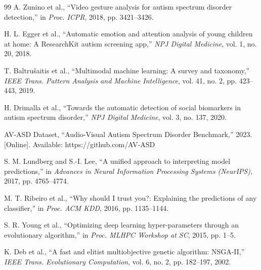 \documentclass[conference]{IEEEtran}
\begin{document}
\begin{thebibliography}{99}
A. Zunino et al., ``Video gesture analysis for autism spectrum disorder detection,'' in \textit{Proc. ICPR}, 2018, pp. 3421--3426.

H. L. Egger et al., ``Automatic emotion and attention analysis of young children at home: A ResearchKit autism screening app,'' \textit{NPJ Digital Medicine}, vol. 1, no. 20, 2018.

T. Baltru\v{s}aitis et al., ``Multimodal machine learning: A survey and taxonomy,'' \textit{IEEE Trans. Pattern Analysis and Machine Intelligence}, vol. 41, no. 2, pp. 423--443, 2019.

H. Drimalla et al., ``Towards the automatic detection of social biomarkers in autism spectrum disorder,'' \textit{NPJ Digital Medicine}, vol. 3, no. 137, 2020.

AV-ASD Dataset, ``Audio-Visual Autism Spectrum Disorder Benchmark,'' 2023. [Online]. Available: https://github.com/AV-ASD

S. M. Lundberg and S.-I. Lee, ``A unified approach to interpreting model predictions,'' in \textit{Advances in Neural Information Processing Systems (NeurIPS)}, 2017, pp. 4765--4774.

M. T. Ribeiro et al., ``Why should I trust you?: Explaining the predictions of any classifier,'' in \textit{Proc. ACM KDD}, 2016, pp. 1135--1144.

S. R. Young et al., ``Optimizing deep learning hyper-parameters through an evolutionary algorithm,'' in \textit{Proc. MLHPC Workshop at SC}, 2015, pp. 1--5.

K. Deb et al., ``A fast and elitist multiobjective genetic algorithm: NSGA-II,'' \textit{IEEE Trans. Evolutionary Computation}, vol. 6, no. 2, pp. 182--197, 2002.

\end{thebibliography}
\end{document}
